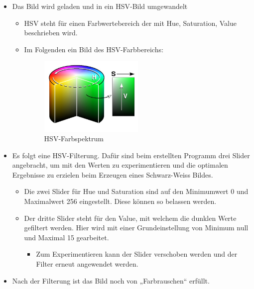 \begin{itemize}
    \item Das Bild wird geladen und in ein HSV-Bild umgewandelt
    \begin{itemize}
        \item HSV steht für einen Farbwertebereich der mit Hue, Saturation, 
            Value beschrieben wird.
        \item Im Folgenden ein Bild des HSV-Farbbereichs:\\
        \begin{figure}[h!]
            \centering
            \includegraphics[width=0.5\textwidth]{fig/HSV_cylinder.jpg}
            \caption[HSV-Farbspektrum]{HSV-Farbspektrum \cite{wiki:gimp2_farbmodelle}}
            \label{fig:HSV-Farbspektrum}
        \end{figure}
    \end{itemize}
    \item Es folgt eine HSV-Filterung. Dafür sind beim erstellten Programm drei 
        Slider angebracht, um mit den Werten zu experimentieren und die 
        optimalen Ergebnisse zu erzielen beim Erzeugen eines Schwarz-Weiss Bildes.
    \begin{itemize}
        \item Die zwei Slider für Hue und Saturation sind auf den Minimumwert 0 
            und Maximalwert 256 eingestellt. Diese können so belassen werden.
        \item Der dritte Slider steht für den Value, mit welchem die dunklen Werte 
            gefiltert werden. Hier wird mit einer Grundeinstellung von Minimum 
            null und Maximal 15 gearbeitet.
        \begin{itemize}
            \item Zum Experimentieren kann der Slider verschoben werden und 
                der Filter erneut angewendet werden.
        \end{itemize}
    \end{itemize}
    \item Nach der Filterung ist das Bild noch von „Farbrauschen“ erfüllt. 

\end{itemize}
